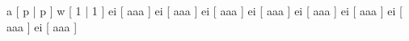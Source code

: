 \xtable
{
  a [ p | p ]
  w [ 1 | 1 ]
  ei [ aaa ]
  ei [ aaa ]
  ei [ aaa ]
  ei [ aaa ]
  ei [ aaa ]
  ei [ aaa ]
  ei [ aaa ]
  ei [ aaa ]
}
